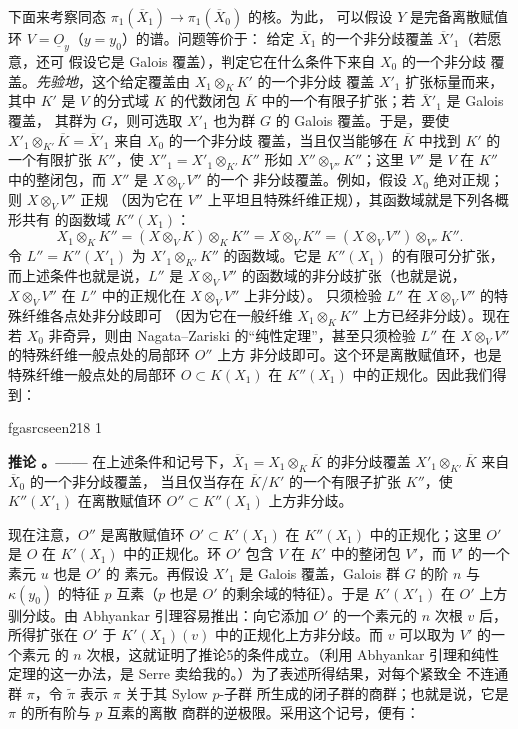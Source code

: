 \documentclass[12pt,twoside,openany]{book}
\numberwithin{equation}{section}
\newcommand{\fgaunitid}{unbound}
\newcommand{\src}[1]{%
  \phantomsection
  \hypertarget{src:\fgaunitid:#1}{}%
  \hypertarget{fga.\fgaunitid.p#1}{}%
  \ifcsname fgasrcseen#1\endcsname\else
    \expandafter\gdef\csname fgasrcseen#1\endcsname{1}%
    \hypertarget{src:#1}{}%
  \fi
  \marginpar{\raggedleft\footnotesize\sffamily #1}%
}
\newcommand{\Osh}{\underline{O}}
\newcommand{\fquote}[1]{“#1”}
\theoremstyle{plain}
\theoremstyle{definition}
\theoremstyle{remark}
\newcommand{\result}[2]{%
  \par\medskip\noindent\textbf{#1%
  \if\relax\detokenize{#2}\relax\else\space#2\fi。——}\enspace
}
\begin{document}
下面来考察同态
$\pi_1(\overline X_1)\longrightarrow\pi_1(\overline X_0)$ 的核。为此，
可以假设 $Y$ 是完备离散赋值环 $V=\Osh_y$（$y=y_0$）的谱。问题等价于：
给定 $\overline X_1$ 的一个非分歧覆盖 $\overline X'_1$（若愿意，还可
假设它是 Galois 覆盖），判定它在什么条件下来自 $X_0$ 的一个非分歧
覆盖。\textit{先验地}，这个给定覆盖由 $X_1\otimes_KK'$ 的一个非分歧
覆盖 $X'_1$ 扩张标量而来，其中 $K'$ 是 $V$ 的分式域 $K$ 的代数闭包
$\overline K$ 中的一个有限子扩张；若 $\overline X'_1$ 是 Galois 覆盖，
其群为 $G$，则可选取 $X'_1$ 也为群 $G$ 的 Galois 覆盖。于是，要使
$X'_1\otimes_{K'}\overline K=\overline X'_1$ 来自 $X_0$ 的一个非分歧
覆盖，当且仅当能够在 $\overline K$ 中找到
$K'$ 的一个有限扩张 $K''$，使
$X''_1=X'_1\otimes_{K'}K''$ 形如 $X''\otimes_{V''}K''$；这里 $V''$
是 $V$ 在 $K''$ 中的整闭包，而 $X''$ 是 $X\otimes_VV''$ 的一个
非分歧覆盖。例如，假设 $X_0$ 绝对正规；则 $X\otimes_VV''$ 正规
（因为它在 $V''$ 上平坦且特殊纤维正规），其函数域就是下列各概形共有
的函数域 $K''(X_1)$：
\[
  X_1\otimes_KK''
  =(X\otimes_VK)\otimes_KK''
  =X\otimes_VK''
  =(X\otimes_VV'')\otimes_{V''}K''.
\]
令 $L''=K''(X'_1)$ 为 $X'_1\otimes_{K'}K''$ 的函数域。它是
$K''(X_1)$ 的有限可分扩张，而上述条件也就是说，$L''$ 是
$X\otimes_VV''$ 的函数域的非分歧扩张（也就是说，
$X\otimes_VV''$ 在 $L''$ 中的正规化在 $X\otimes_VV''$ 上非分歧）。
只须检验 $L''$ 在 $X\otimes_VV''$ 的特殊纤维各点处非分歧即可
（因为它在一般纤维 $X_1\otimes_KK''$ 上方已经非分歧）。现在若
$X_0$ 非奇异，则由 Nagata--Zariski 的\fquote{纯性定理}，甚至只须检验
$L''$ 在 $X\otimes_VV''$ 的特殊纤维一般点处的局部环 $O''$ 上方
非分歧即可。这个环是离散赋值环，也是特殊纤维一般点处的局部环
$O\subset K(X_1)$ 在 $K''(X_1)$ 中的正规化。因此我们得到：

\src{218}
\result{推论}{5} 在上述条件和记号下，$\overline X_1=
X_1\otimes_K\overline K$ 的非分歧覆盖
$X'_1\otimes_{K'}\overline K$ 来自 $\overline X_0$ 的一个非分歧覆盖，
当且仅当存在 $\overline K/K'$ 的一个有限子扩张 $K''$，使
$K''(X'_1)$ 在离散赋值环 $O''\subset K''(X_1)$ 上方非分歧。

现在注意，$O''$ 是离散赋值环 $O'\subset K'(X_1)$ 在 $K''(X_1)$
中的正规化；这里 $O'$ 是 $O$ 在 $K'(X_1)$ 中的正规化。环 $O'$ 包含
$V$ 在 $K'$ 中的整闭包 $V'$，而 $V'$ 的一个素元 $u$ 也是 $O'$ 的
素元。再假设 $X'_1$ 是 Galois 覆盖，Galois 群 $G$ 的阶 $n$ 与
$\kappa(y_0)$ 的特征 $p$ 互素（$p$ 也是 $O'$ 的剩余域的特征）。于是
$K'(X'_1)$ 在 $O'$ 上方驯分歧。由 Abhyankar 引理容易推出：向它添加
$O'$ 的一个素元的 $n$ 次根 $v$ 后，所得扩张在 $O'$ 于
$K'(X_1)(v)$ 中的正规化上方非分歧。而 $v$ 可以取为 $V'$ 的一个素元
的 $n$ 次根，这就证明了推论5的条件成立。（利用 Abhyankar 引理和纯性
定理的这一办法，是 Serre 卖给我的。）为了表述所得结果，对每个紧致全
不连通群 $\pi$，令 $\widetilde\pi$ 表示 $\pi$ 关于其 Sylow $p$-子群
所生成的闭子群的商群；也就是说，它是 $\pi$ 的所有阶与 $p$ 互素的离散
商群的逆极限。采用这个记号，便有：
\end{document}
